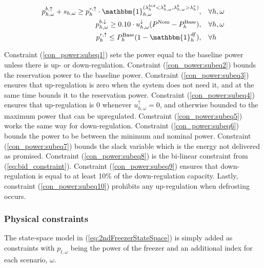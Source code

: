 \begin{subequations}
\begin{align}
        p^{b, \uparrow}_{h,\omega} + s_{h,\omega} \geq p^{r,\uparrow}_{h} \cdot \mathbbm{1}_{h,\omega}^{(\lambda^{bid}_{h} < \lambda^{b}_{h,\omega}, \lambda^{b}_{h,\omega} > \lambda^{s}_{h})}, \quad & \forall{h,\omega} \label{con_power:subeq8}                                                                              \\
        p^{b, \downarrow}_{h,\omega} \geq 0.10 \cdot u^{\downarrow}_{h,\omega} (P^{\text{Nom}} - P^{\text{Base}}_{h}), \quad                                                                           & \forall{h,\omega}                                                                             \label{con_power:subeq9}  \\
        p^{r, \uparrow}_{h} \leq P^{\text{Base}}_{h} (1 - \mathbbm{1}_{h}^{df}), \quad                                                                                                                 & \forall{h} \label{con_power:subeq10}
    \end{align}
\end{subequations}

Constraint (\ref{con_power:subeq1}) sets the power equal to the baseline power unless there is up- or down-regulation. Constraint (\ref{con_power:subeq2}) bounds the reservation power to the baseline power. Constraint (\ref{con_power:subeq3}) ensures that up-regulation is zero when the system does not need it, and at the same time bounds it to the reservation power. Constraint (\ref{con_power:subeq4}) ensures that up-regulation is 0 whenever $u^{\uparrow}_{h,\omega} = 0$, and otherwise bounded to the maximum power that can be upregulated. Constraint (\ref{con_power:subeq5}) works the same way for down-regulation. Constraint (\ref{con_power:subeq6}) bounds the power to be between the minimum and nominal power. Constraint (\ref{con_power:subeq7}) bounds the slack variable which is the energy not delivered as promised. Constraint (\ref{con_power:subeq8}) is the bi-linear constraint from (\ref{eq:bid_constraint}). Constraint (\ref{con_power:subeq9}) ensures that down-regulation is equal to at least 10\% of the down-regulation capacity. Lastly, constraint (\ref{con_power:subeq10}) prohibits any up-regulation when defrosting occurs.

\subsubsection{Physical constraints}\label{sec:temperature_constraints}

The state-space model in (\ref{eq:2ndFreezerStateSpace}) is simply added as constraints with $p_{t,\omega}$ being the power of the freezer and an additional index for each scenario, $\omega$.

